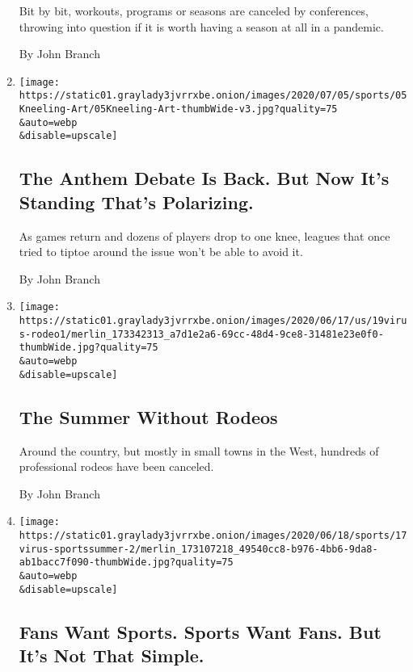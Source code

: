 \begin{enumerate}
  Bit by bit, workouts, programs or seasons are canceled by conferences,
  throwing into question if it is worth having a season at all in a
  pandemic.

  By John Branch
\item
  \href{/2020/07/04/sports/football/anthem-kneeling-sports.html}{}

  \texttt{[image: https://static01.graylady3jvrrxbe.onion/images/2020/07/05/sports/05Kneeling-Art/05Kneeling-Art-thumbWide-v3.jpg?quality=75\\\&auto=webp\\\&disable=upscale]}

  \hypertarget{the-anthem-debate-is-back-but-now-its-standing-thats-polarizing}{%
  \subsection{The Anthem Debate Is Back. But Now It's Standing That's
  Polarizing.}\label{the-anthem-debate-is-back-but-now-its-standing-thats-polarizing}}

  As games return and dozens of players drop to one knee, leagues that
  once tried to tiptoe around the issue won't be able to avoid it.

  By John Branch
\item
  \href{/2020/06/19/us/coronavirus-rodeos.html}{}

  \texttt{[image: https://static01.graylady3jvrrxbe.onion/images/2020/06/17/us/19virus-rodeo1/merlin\_173342313\_a7d1e2a6-69cc-48d4-9ce8-31481e23e0f0-thumbWide.jpg?quality=75\\\&auto=webp\\\&disable=upscale]}

  \hypertarget{the-summer-without-rodeos}{%
  \subsection{The Summer Without
  Rodeos}\label{the-summer-without-rodeos}}

  Around the country, but mostly in small towns in the West, hundreds of
  professional rodeos have been canceled.

  By John Branch
\item
  \href{/2020/06/18/sports/baseball/coronavirus-fans-return.html}{}

  \texttt{[image: https://static01.graylady3jvrrxbe.onion/images/2020/06/18/sports/17virus-sportssummer-2/merlin\_173107218\_49540cc8-b976-4bb6-9da8-ab1bacc7f090-thumbWide.jpg?quality=75\\\&auto=webp\\\&disable=upscale]}

  \hypertarget{fans-want-sports-sports-want-fans-but-its-not-that-simple}{%
  \subsection{Fans Want Sports. Sports Want Fans. But It's Not That
  Simple.}\label{fans-want-sports-sports-want-fans-but-its-not-that-simple}}


\end{enumerate}
